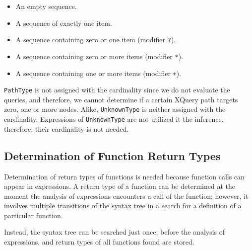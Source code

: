 \begin{itemize}
\item An empty sequence.
\item A sequence of exactly one item.
\item A sequence containing zero or one item (modifier \texttt{?}).
\item A sequence containing zero or more items (modifier \texttt{*}).
\item A sequence containing one or more items (modifier \texttt{+}).
\end{itemize}

\texttt{PathType} is not assigned with the cardinality since we do not evaluate the queries, and therefore, we cannot determine if a certain XQuery path targets zero, one or more nodes. Alike, \texttt{UnknownType} is neither assigned with the cardinality. Expressions of \texttt{UnknownType} are not utilized it the inference, therefore, their cardinality is not needed.


\subsection{Determination of Function Return Types}
Determination of return types of functions is needed because function calls can appear in expressions. A return type of a function can be determined at the moment the analysis of expressions encounters a call of the function; however, it involves multiple transitions of the syntax tree in a search for a definition of a particular function.

Instead, the syntax tree can be searched just once, before the analysis of expressions, and return types of all functions found are stored.

